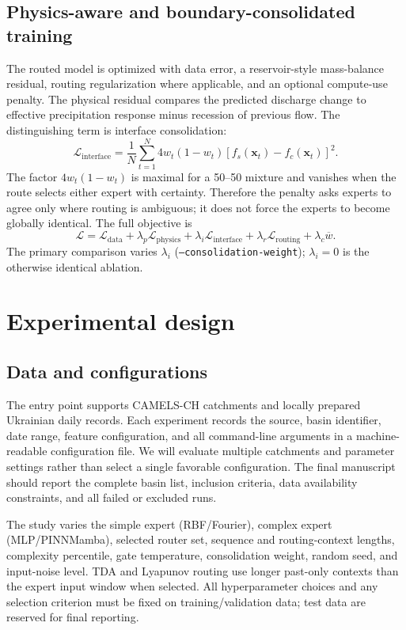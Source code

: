 \documentclass[11pt]{article}
\begin{document}
\subsection{Physics-aware and boundary-consolidated training}
The routed model is optimized with data error, a reservoir-style mass-balance residual, routing regularization where applicable, and an optional compute-use penalty. The physical residual compares the predicted discharge change to effective precipitation response minus recession of previous flow. The distinguishing term is interface consolidation:
\begin{equation}
 \mathcal{L}_{\mathrm{interface}} = \frac{1}{N}\sum_{t=1}^{N}
 4w_t(1-w_t)\left[f_s(\mathbf{x}_t)-f_c(\mathbf{x}_t)\right]^2.
 \label{eq:interface}
\end{equation}
The factor $4w_t(1-w_t)$ is maximal for a 50--50 mixture and vanishes when the route selects either expert with certainty. Therefore the penalty asks experts to agree only where routing is ambiguous; it does not force the experts to become globally identical. The full objective is
\begin{equation}
 \mathcal{L}=\mathcal{L}_{\mathrm{data}}+\lambda_p\mathcal{L}_{\mathrm{physics}}
 +\lambda_i\mathcal{L}_{\mathrm{interface}}+\lambda_r\mathcal{L}_{\mathrm{routing}}
 +\lambda_c\overline{w}.
\end{equation}
The primary comparison varies $\lambda_i$ (\texttt{--consolidation-weight}); $\lambda_i=0$ is the otherwise identical ablation.

\section{Experimental design}
\subsection{Data and configurations}
The entry point supports CAMELS-CH catchments and locally prepared Ukrainian daily records. Each experiment records the source, basin identifier, date range, feature configuration, and all command-line arguments in a machine-readable configuration file. We will evaluate multiple catchments and parameter settings rather than select a single favorable configuration. The final manuscript should report the complete basin list, inclusion criteria, data availability constraints, and all failed or excluded runs.

The study varies the simple expert (RBF/Fourier), complex expert (MLP/PINNMamba), selected router set, sequence and routing-context lengths, complexity percentile, gate temperature, consolidation weight, random seed, and input-noise level. TDA and Lyapunov routing use longer past-only contexts than the expert input window when selected. All hyperparameter choices and any selection criterion must be fixed on training/validation data; test data are reserved for final reporting.
\end{document}
